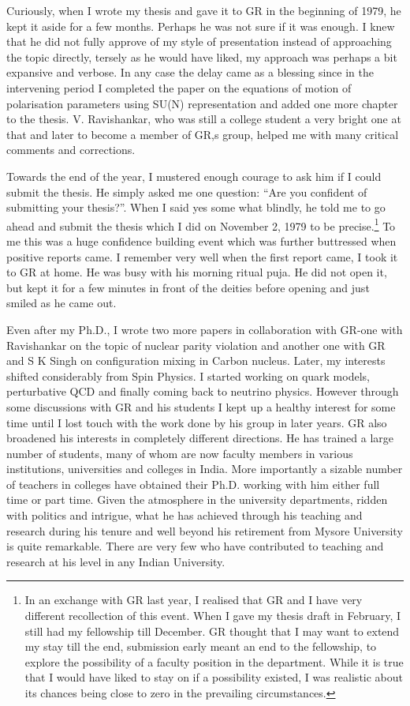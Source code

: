 Curiously, when I wrote my thesis and gave it to GR in the beginning of 1979, he kept it aside for a few months. Perhaps he was not sure if it was enough. I knew that he did not fully approve of my style of presentation instead of approaching the topic directly, tersely as he would have liked, my approach was perhaps a bit expansive and verbose. In any case the delay came as a blessing since in the intervening period I completed the paper on the equations of motion of polarisation parameters using SU(N) representation and added one more chapter to the thesis. V. Ravishankar, who was still a college student a very bright one at that and later to become a member of GR,s group, helped me with many critical comments and corrections.

Towards the end of the year, I mustered enough courage to ask him if I could submit the thesis. He simply asked me one question: “Are you confident of submitting your thesis?”. When I said yes some what blindly, he told me to go ahead and submit the thesis which I did on November 2, 1979 to be precise.\footnote{In an exchange with GR last year, I realised that GR and I have very different recollection of this event. When I gave my thesis draft in February, I still had my fellowship till December. GR thought that I may want to extend my stay till the end, submission early meant an end to the fellowship, to explore the possibility of a faculty position in the department. While it is true that I would have liked to stay on if a possibility existed, I was realistic about its chances being close to zero in the prevailing circumstances.} To me this was a huge confidence building event which was further buttressed when positive reports came. I remember very well when the first report came, I took it to GR at home. He was busy with his morning ritual puja. He did not open it, but kept it for a few minutes in front of the deities before opening and just smiled as he came out. 
\newpage

Even after my Ph.D., I wrote two more papers in collaboration with GR-one with Ravishankar on the topic of nuclear parity violation and another one with GR and S K Singh on configuration mixing in Carbon nucleus. Later, my interests shifted considerably from Spin Physics. I started working on quark models, perturbative QCD and finally coming back to neutrino physics. However through some discussions with GR and his students I kept up a healthy interest for some time until I lost touch with the work done by his group in later years. GR also broadened his interests in completely different directions. He has trained a large number of students, many of whom are now faculty members in various institutions, universities and colleges in India. More importantly a sizable number of teachers in colleges have obtained their Ph.D. working with him either full time or part time. Given the atmosphere in the university departments, ridden with politics and intrigue, what he has achieved through his teaching and research during his tenure and well beyond his retirement from Mysore University is quite remarkable. There are very few who have contributed to teaching and research at his level in any Indian University.

